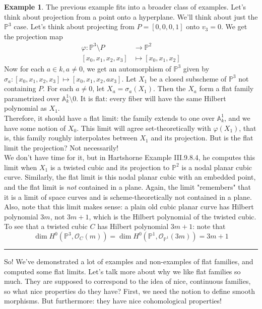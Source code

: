 \documentclass[10pt,reqno]{amsart}
\theoremstyle{definition}
\newtheorem{example}[theorem]{Example}
\theoremstyle{remark}
\numberwithin{equation}{section}
\numberwithin{theorem}{section}
\newcommand{\OO}{{\mathcal O}}
\newcommand{\A}{{\mathbb A}}
\newcommand{\PP}{{\mathbb P}}
\begin{document}
\begin{example} The previous example fits into a broader class of examples. Let's think about projection from a point onto a hyperplane. We'll think about just the $\PP^3$ case. Let's think about projecting from $P = [0,0,0,1]$ onto $v_3 = 0$. We get the projection map
\begin{align*}
\varphi: \PP^3 \setminus P &\to \PP^2\\
[x_0,x_1,x_2,x_3] &\mapsto [x_0,x_1,x_2]
\end{align*}
Now for each $a \in k, a \ne 0$, we get an automorphism of $\PP^3$ given by $\sigma_a: [x_0,x_1,x_2,x_3] \mapsto [x_0,x_1,x_2,ax_3]$. Let $X_1$ be a closed subscheme of $\PP^3$ not containing $P$. For each $a \ne 0$, let $X_a = \sigma_a(X_1)$. Then the $X_a$ form a flat family parametrized over $\A^1_k \setminus 0$. It is flat: every fiber will have the same Hilbert polynomial as $X_1$. 
\\

Therefore, it should have a flat limit: the family extends to one over $\A^1_k$, and we have some notion of $X_0$. This limit will agree set-theoretically with $\varphi(X_1)$, that is, this family roughly interpolates between $X_1$ and its projection. But is the flat limit the projection? Not necessarily!
\\

We don't have time for it, but in Hartshorne Example III.9.8.4, he computes this limit when $X_1$ is a twisted cubic and its projection to $\PP^2$ is a nodal planar cubic curve. Similarly, the flat limit is this nodal planar cubic with an embedded point, and the flat limit is \textit{not} contained in a plane. Again, the limit "remembers" that it is a limit of space curves and is scheme-theoretically not contained in a plane. Also, note that this limit makes sense: a plain old cubic planar curve has Hilbert polynomial $3m$, not $3m+1$, which is the Hilbert polynomial of the twisted cubic.
\\

To see that a twisted cubic $C$ has Hilbert polynomial $3m+1$: note that 
\[\dim H^0(\PP^3, \OO_C(m)) = \dim H^0(\PP^1,\OO_{\PP^1}(3m)) = 3m+1\]
\end{example}

\hrule
\vspace{1em}

So! We've demonstrated a lot of examples and non-examples of flat families, and computed some flat limits. Let's talk more about why we like flat families so much. They are supposed to correspond to the idea of nice, continuous families, so what nice properties do they have? First, we need the notion to define smooth morphisms. But furthermore: they have nice cohomological properties!
\end{document}
